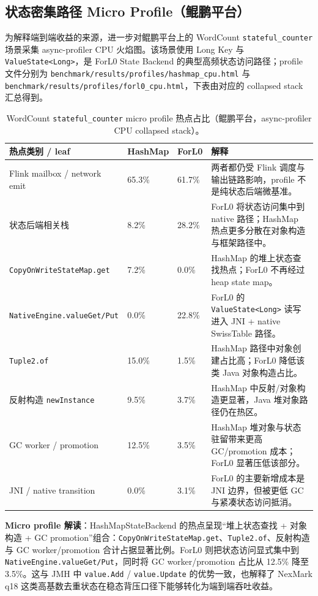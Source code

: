 \documentclass[a4paper,11pt]{article}
\newcommand{\project}{ForL0 State Backend}
\begin{document}
\subsection{状态密集路径 Micro Profile（鲲鹏平台）}

为解释端到端收益的来源，进一步对鲲鹏平台上的 WordCount \texttt{stateful\_counter} 场景采集 async-profiler CPU 火焰图。该场景使用 Long Key 与 \texttt{ValueState<Long>}，是 \project{} 的典型高频状态访问路径；profile 文件分别为 \texttt{benchmark/results/profiles/hashmap\_cpu.html} 与 \texttt{benchmark/results/profiles/forl0\_cpu.html}，下表由对应的 collapsed stack 汇总得到。

\begin{table}[H]
\centering
\scriptsize
\begin{tabularx}{\textwidth}{L{3.6cm} R{1.7cm} R{1.7cm} X}
\toprule
\textbf{热点类别 / leaf} & \textbf{HashMap} & \textbf{ForL0} & \textbf{解释} \\
\midrule
Flink mailbox / network emit & 65.3\% & 61.7\% & 两者都仍受 Flink 调度与输出链路影响，profile 不是纯状态后端微基准。 \\
状态后端相关栈 & 8.2\% & 28.2\% & ForL0 将状态访问集中到 native 路径；HashMap 热点更多分散在对象构造与框架路径中。 \\
\texttt{CopyOnWriteStateMap.get} & 7.2\% & 0.0\% & HashMap 的堆上状态查找热点；ForL0 不再经过 heap state map。 \\
\texttt{NativeEngine.valueGet/Put} & 0.0\% & 22.8\% & ForL0 的 \texttt{ValueState<Long>} 读写进入 JNI + native SwissTable 路径。 \\
\texttt{Tuple2.of} & 15.0\% & 1.5\% & HashMap 路径中对象创建占比高；ForL0 降低该类 Java 对象构造占比。 \\
反射构造 \texttt{newInstance} & 9.5\% & 3.7\% & HashMap 中反射/对象构造更显著，Java 堆对象路径仍在热区。 \\
GC worker / promotion & 12.5\% & 3.5\% & HashMap 堆对象与状态驻留带来更高 GC/promotion 成本；ForL0 显著压低该部分。 \\
JNI / native transition & 0.0\% & 3.1\% & ForL0 的主要新增成本是 JNI 边界，但被更低 GC 与紧凑状态访问抵消。 \\
\bottomrule
\end{tabularx}
\caption{WordCount \texttt{stateful\_counter} micro profile 热点占比（鲲鹏平台，async-profiler CPU collapsed stack）。}
\label{tab:micro-profile}
\end{table}

\textbf{Micro profile 解读}：HashMapStateBackend 的热点呈现“堆上状态查找 + 对象构造 + GC promotion”组合：\texttt{CopyOnWriteStateMap.get}、\texttt{Tuple2.of}、反射构造与 GC worker/promotion 合计占据显著比例。ForL0 则把状态访问显式集中到 \texttt{NativeEngine.valueGet/Put}，同时将 GC worker/promotion 占比从 12.5\% 降至 3.5\%。这与 JMH 中 \texttt{value.Add} / \texttt{value.Update} 的优势一致，也解释了 NexMark q18 这类高基数去重状态在稳态背压口径下能够转化为端到端吞吐收益。
\end{document}
